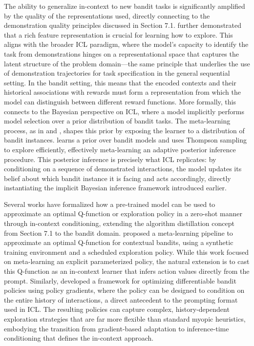 \documentclass[11pt]{article}
\begin{document}
The ability to generalize in-context to new bandit tasks is significantly amplified by the quality of the representations used, directly connecting to the demonstration quality principles discussed in Section 7.1. \cite{ref313} further demonstrated that a rich feature representation is crucial for learning how to explore. This aligns with the broader ICL paradigm, where the model's capacity to identify the task from demonstrations hinges on a representational space that captures the latent structure of the problem domain---the same principle that underlies the use of demonstration trajectories for task specification in the general sequential setting. In the bandit setting, this means that the encoded contexts and their historical associations with rewards must form a representation from which the model can distinguish between different reward functions. More formally, this connects to the Bayesian perspective on ICL, where a model implicitly performs model selection over a prior distribution of bandit tasks. The meta-learning process, as in \cite{ref325} and \cite{ref326}, shapes this prior by exposing the learner to a distribution of bandit instances. \cite{ref325} learns a prior over bandit models and uses Thompson sampling to explore efficiently, effectively meta-learning an adaptive posterior inference procedure. This posterior inference is precisely what ICL replicates: by conditioning on a sequence of demonstrated interactions, the model updates its belief about which bandit instance it is facing and acts accordingly, directly instantiating the implicit Bayesian inference framework introduced earlier.

Several works have formalized how a pre-trained model can be used to approximate an optimal Q-function or exploration policy in a zero-shot manner through in-context conditioning, extending the algorithm distillation concept from Section 7.1 to the bandit domain. \cite{ref327} proposed a meta-learning pipeline to approximate an optimal Q-function for contextual bandits, using a synthetic training environment and a scheduled exploration policy. While this work focused on meta-learning an explicit parameterized policy, the natural extension is to cast this Q-function as an in-context learner that infers action values directly from the prompt. Similarly, \cite{ref326} developed a framework for optimizing differentiable bandit policies using policy gradients, where the policy can be designed to condition on the entire history of interactions, a direct antecedent to the prompting format used in ICL. The resulting policies can capture complex, history-dependent exploration strategies that are far more flexible than standard myopic heuristics, embodying the transition from gradient-based adaptation to inference-time conditioning that defines the in-context approach.
\end{document}
